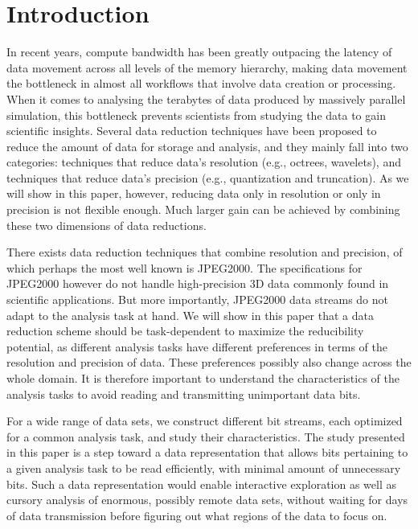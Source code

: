 \section{Introduction}

In recent years, compute bandwidth has been greatly outpacing the latency of data movement across all levels of the memory hierarchy, making data movement the bottleneck in almost all workflows that involve data creation or processing. When it comes to analysing the terabytes of data produced by massively parallel simulation, this bottleneck prevents scientists from studying the data to gain scientific insights. Several data reduction techniques have been proposed to reduce the amount of data for storage and analysis, and they mainly fall into two categories: techniques that reduce data's resolution (e.g., octrees, wavelets), and techniques that reduce data's precision (e.g., quantization and truncation). As we will show in this paper, however, reducing data only in resolution or only in precision is not flexible enough. Much larger gain can be achieved by combining these two dimensions of data reductions. 

There exists data reduction techniques that combine resolution and precision, of which perhaps the most well known is JPEG2000. The specifications for JPEG2000 however do not handle high-precision 3D data commonly found in scientific applications. But more importantly, JPEG2000 data streams do not adapt to the analysis task at hand. We will show in this paper that a data reduction scheme should be task-dependent to maximize the reducibility potential, as different analysis tasks have different preferences in terms of the resolution and precision of data. These preferences possibly also change across the whole domain. It is therefore important to understand the characteristics of the analysis tasks to avoid reading and transmitting unimportant data bits.

For a wide range of data sets, we construct different bit streams, each optimized for a common analysis task, and study their characteristics. The study presented in this paper is a step toward a data representation that allows bits pertaining to a given analysis task to be read efficiently, with minimal amount of unnecessary bits. Such a data representation would enable interactive exploration as well as cursory analysis of enormous, possibly remote data sets, without waiting for days of data transmission before figuring out what regions of the data to focus on.

